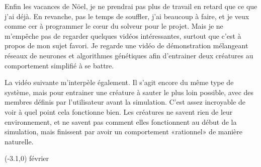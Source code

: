 \documentclass[letterpaper, 12pt]{report} %
\newcommand{\datemarge}[1]{%
    \begin{textblock}{3}(-3.1,0)
        {\color{blue}#1}
    \end{textblock}
}
\begin{document}
{
Enfin les vacances de Nöel, je ne prendrai pas plus de travail en retard que ce que j'ai déjà. 
En revanche, pas le temps de souffler, j'ai beaucoup à faire, et je veux comme cer à programmer le c\oe{}ur du solveur pour le projet.
Mais je ne m'empêche pas de regarder quelques vidéos intéressantes, surtout que c'est à propos de mon sujet favori.
Je regarde une vidéo de démonstration mélangeant réseaux de neurones et algorithmes génétiques afin d'entrainer deux créatures au comportement simplifié à se battre.

La vidéo suivante m'interpèle également.
Il s'agit encore du même type de système, mais pour entrainer une créature à sauter le plus loin possible, avec des membres définis par l'utilisateur avant la simulation.
C'est assez incroyable de voir à quel point cela fonctionne bien.
Les créatures ne savent rien de leur environnement, et ne savent pas comment elles fonctionnent au début de la simulation, mais finissent par avoir un comportement «rationnel» de manière naturelle.




 
\newpage
\hfill\vspace{-0.5cm}
\datemarge{février}


%



}
\end{document}
